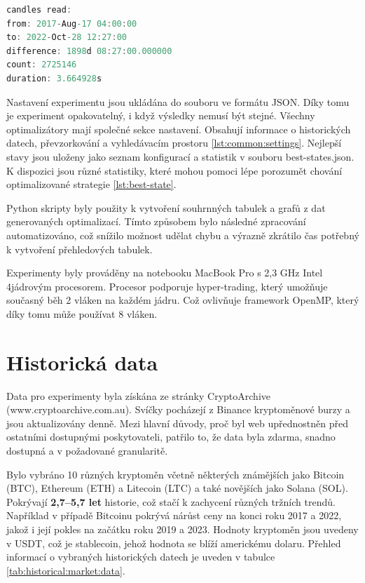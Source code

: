 \begin{lstlisting}[caption={~Informace o načtených historických svíčkách z výstupního logu},label={lst:log:candles},captionpos=t,abovecaptionskip=-\medskipamount,belowcaptionskip=\medskipamount,language=C]
candles read:
from: 2017-Aug-17 04:00:00
to: 2022-Oct-28 12:27:00
difference: 1898d 08:27:00.000000
count: 2725146
duration: 3.664928s
\end{lstlisting}

Nastavení experimentu jsou ukládána do souboru ve formátu JSON.
Díky tomu je experiment opakovatelný, i když výsledky nemusí být stejné.
Všechny optimalizátory mají společné sekce nastavení.
Obsahují informace o historických datech, převzorkování a vyhledávacím prostoru \ref{lst:common:settings}.
Nejlepší stavy jsou uloženy jako seznam konfigurací a statistik v souboru best-states.json.
K dispozici jsou různé statistiky, které mohou pomoci lépe porozumět chování optimalizované strategie \ref{lst:best-state}.

Python skripty byly použity k vytvoření souhrnných tabulek a grafů z dat generovaných optimalizací.
Tímto způsobem bylo následné zpracování automatizováno, což snížilo možnost udělat chybu a výrazně zkrátilo čas potřebný k vytvoření přehledových tabulek.

Experimenty byly prováděny na notebooku MacBook Pro s 2,3 GHz Intel 4jádrovým procesorem.
Procesor podporuje hyper-trading, který umožňuje současný běh 2 vláken na každém jádru.
Což ovlivňuje framework OpenMP, který díky tomu může používat 8 vláken.

\section{Historická data}
Data pro experimenty byla získána ze stránky CryptoArchive (www.cryptoarchive.com.au).
Svíčky pocházejí z Binance kryptoměnové burzy a jsou aktualizovány denně.
Mezi hlavní důvody, proč byl web upřednostněn před ostatními dostupnými poskytovateli, patřilo to, že data byla zdarma, snadno dostupná a v požadované granularitě.

Bylo vybráno 10 různých kryptoměn včetně některých známějších jako Bitcoin (BTC), Ethereum (ETH) a Litecoin (LTC) a také novějších jako Solana (SOL).
Pokrývají \textbf{2,7--5,7 let} historie, což stačí k zachycení různých tržních trendů.
Například v případě Bitcoinu pokrývá nárůst ceny na konci roku 2017 a 2022, jakož i její pokles na začátku roku 2019 a 2023.
Hodnoty kryptoměn jsou uvedeny v USDT, což je stablecoin, jehož hodnota se blíží americkému dolaru.
Přehled informací o vybraných historických datech je uveden v tabulce \ref{tab:historical:market:data}.

